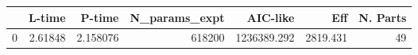 \begin{tabular}{lrrrrrr}
\toprule
{} &   L-time &    P-time &  N\_params\_expt &     AIC-like &       Eff &  N. Parts \\
\midrule
0 &  2.61848 &  2.158076 &         618200 &  1236389.292 &  2819.431 &        49 \\
\bottomrule
\end{tabular}
